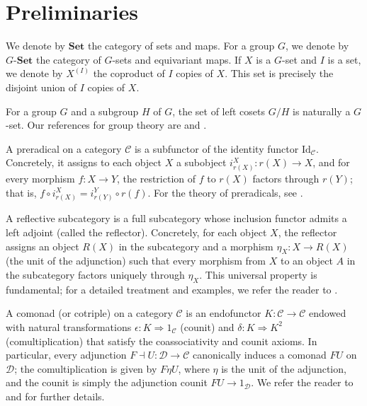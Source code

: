 \documentclass{amsart}
\begin{document}
\section{Preliminaries}
\label{sec:prelim}

We denote by $\mathbf{Set}$ the category of sets and maps. For a group $G$, we denote by $G\text{-}\mathbf{Set}$ the category of $G$-sets and equivariant maps. If $X$ is a $G$-set and $I$ is a set, we denote by $X^{(I)}$ the coproduct of $I$ copies of $X$. This set is precisely the disjoint union of $I$ copies of $X$.

For a group $G$ and a subgroup $H$ of $G$, the set of left cosets $G/H$ is naturally a $G$-set. Our references for group theory are \cite{aschbacher2000finite} and \cite{rotman2012introduction}.

A preradical on a category $\mathcal{C}$ is a subfunctor of the identity functor $\mathrm{Id}_{\mathcal{C}}$. Concretely, it assigns to each object $X$ a subobject $i^X_{r(X)} \colon r(X) \to X$, and for every morphism $f \colon X \to Y$, the restriction of $f$ to $r(X)$ factors through $r(Y)$; that is, $f \circ i^X_{r(X)} = i^Y_{r(Y)} \circ r(f)$. For the theory of preradicals, see \cite{bican1974preradicals, castellini2003categorical, stenstrom1971rings}.

A reflective subcategory is a full subcategory whose inclusion functor admits a left adjoint (called the reflector). Concretely, for each object $X$, the reflector assigns an object $R(X)$ in the subcategory and a morphism $\eta_X \colon X \rightarrow R(X)$ (the unit of the adjunction) such that every morphism from $X$ to an object $A$ in the subcategory factors uniquely through $\eta_X$. This universal property is fundamental; for a detailed treatment and examples, we refer the reader to \cite{borceux1994handbook, maclane1998categories, tholen1987reflective}.

A comonad (or cotriple) on a category $\mathcal{C}$ is an endofunctor $K\colon\mathcal{C}\rightarrow\mathcal{C}$ endowed with natural transformations $\epsilon\colon K\Rightarrow 1_{\mathcal{C}}$ (counit) and $\delta\colon K\Rightarrow K^{2}$ (comultiplication) that satisfy the coassociativity and counit axioms. In particular, every adjunction $F\dashv U\colon\mathcal{D}\rightarrow\mathcal{C}$ canonically induces a comonad $FU$ on $\mathcal{D}$; the comultiplication is given by $F\eta U$, where $\eta$ is the unit of the adjunction, and the counit is simply the adjunction counit $FU\rightarrow 1_{\mathcal{D}}$. We refer the reader to \cite{maclane1998categories} and \cite{borceux1994handbook} for further details.
\end{document}
